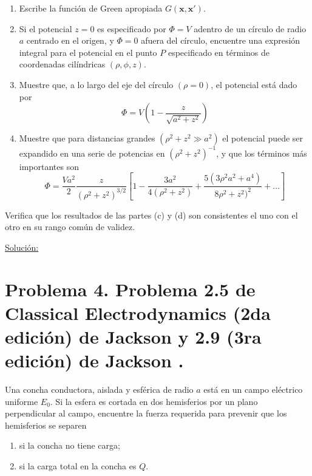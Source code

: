 \documentclass[a4paper,10pt]{article}
\numberwithin{equation}{section}
\begin{document}
\begin{enumerate}[label=\textbf{(\alph*)}]
 \item Escribe la función de Green apropiada $G(\mathbf{x},\mathbf{x}')$.
 \item Si el potencial $z = 0$ es especificado por $\Phi = V$ adentro de un círculo 
 de radio $a$ centrado en el origen, y $\Phi = 0$ afuera del círculo, encuentre 
 una expresión integral para el potencial en el punto $P$ especificado en términos 
 de coordenadas cilíndricas $(\rho,\phi,z)$.
 \item Muestre que, a lo largo del eje del círculo $(\rho = 0)$, el potencial está 
 dado por 
 $$
 \Phi = V\left(1 - \frac{z}{\sqrt{a^2+z^2}}\right)
 $$
 \item Muestre que para distancias grandes $(\rho^2 + z^2 \gg a^2)$ el potencial 
 puede ser expandido en una serie de potencias en $(\rho^2 + z^2)^{-1}$, y que 
 los términos más importantes son 
 $$
 \Phi = \frac{Va^2}{2}\frac{z}{(\rho^2 + z^2)^{3/2}}\left[1 - 
 \frac{3a^2}{4(\rho^2 + z^2)} + \frac{5(3\rho^2a^2+a^4)}{8\rho^2 + z^2)^2} 
 + \dots \right]
 $$
\end{enumerate}

Verifica que los resultados de las partes (c) y (d) son consistentes el uno 
con el otro en su rango común de validez.

\vspace{.3cm}

\underline{Solución:} \vspace{.3cm}

\section{Problema 4. Problema 2.5 de Classical Electrodynamics (2da edición) de Jackson 
\cite{jackson2} y 2.9 (3ra edición) de Jackson \cite{jackson3}.}

Una concha conductora, aislada y esférica de radio $a$ está en un campo eléctrico 
uniforme $E_0$. Si la esfera es cortada en dos hemisferios por un plano perpendicular 
al campo, encuentre la fuerza requerida para prevenir que los hemisferios se 
separen 

\begin{enumerate}[label=\textbf{(\alph*)}]
 \item si la concha no tiene carga;
 \item si la carga total en la concha es $Q$.
\end{enumerate}

\vspace{.3cm}
\end{document}
